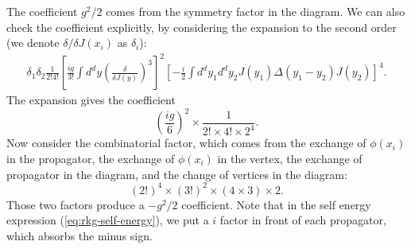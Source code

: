 \begin{framedrmk}
The coefficient $g^2/2$ comes from the symmetry factor in the diagram. We can also check the coefficient explicitly, by considering the expansion to the second order (we denote $\delta/\delta J(x_i)$ as $\delta_i$):
\begin{equation*}
\begin{aligned}
	\delta_{1}\delta_{2}\frac{1}{2!4!}\left[\frac{ig}{3!}\int d^dy \left(\frac{\delta}{\delta J(y)}\right)^3 \right]^2
	\left[-\frac{i}{2}\int d^dy_1 d^dy_2 J(y_1)\Delta(y_1-y_2)J(y_2)\right]^4.
\end{aligned}
\end{equation*}
The expansion gives the coefficient
\begin{equation*}
	\left(\frac{ig}{6}\right)^2\times \frac{1}{2!\times 4! \times 2^4}.
\end{equation*}
Now consider the combinatorial factor, which comes from the exchange of $\phi(x_i)$ in the propagator, the exchange of $\phi(x_i)$ in the vertex, the exchange of propagator in the diagram, and the change of vertices in the diagram:
\begin{equation*}
	(2!)^4\times(3!)^2\times(4\times 3)\times2.
\end{equation*}
Those two factors produce a $-g^2/2$ coefficient.
Note that in the self energy expression (\ref{eq:rkg-self-energy}), we put a $i$ factor in front of each propagator, which absorbs the minus sign.
\end{framedrmk}

